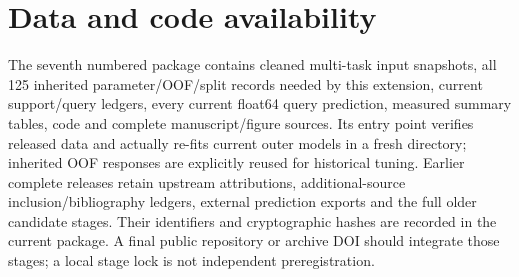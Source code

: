 \documentclass[11pt]{article}
\begin{document}
\section*{Data and code availability}
The seventh numbered package contains cleaned multi-task input snapshots, all 125 inherited parameter/OOF/split records needed by this extension, current support/query ledgers, every current float64 query prediction, measured summary tables, code and complete manuscript/figure sources. Its entry point verifies released data and actually re-fits current outer models in a fresh directory; inherited OOF responses are explicitly reused for historical tuning. Earlier complete releases retain upstream attributions, additional-source inclusion/bibliography ledgers, external prediction exports and the full older candidate stages. Their identifiers and cryptographic hashes are recorded in the current package. A final public repository or archive DOI should integrate those stages; a local stage lock is not independent preregistration.


\end{document}
